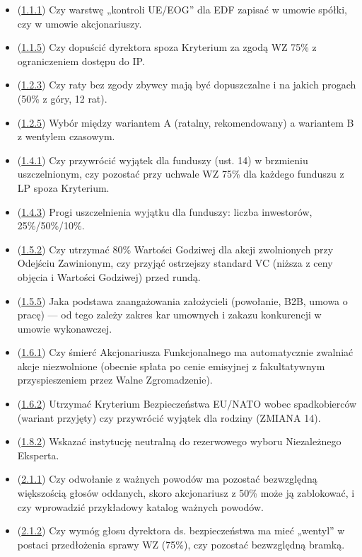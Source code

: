 \documentclass[12pt,a4paper]{report}
\begin{document}
\begin{itemize}
  \item (\hyperref[memo:1.1.1]{1.1.1}) Czy warstwę „kontroli UE/EOG” dla EDF zapisać w umowie spółki, czy w umowie akcjonariuszy.
  \item (\hyperref[memo:1.1.5]{1.1.5}) Czy dopuścić dyrektora spoza Kryterium za zgodą WZ 75\% z ograniczeniem dostępu do IP.
  \item (\hyperref[memo:1.2.3]{1.2.3}) Czy raty bez zgody zbywcy mają być dopuszczalne i na jakich progach (50\% z góry, 12 rat).
  \item (\hyperref[memo:1.2.5]{1.2.5}) Wybór między wariantem A (ratalny, rekomendowany) a wariantem B z wentylem czasowym.
  \item (\hyperref[memo:1.4.1]{1.4.1}) Czy przywrócić wyjątek dla funduszy (ust. 14) w brzmieniu uszczelnionym, czy pozostać przy uchwale WZ 75\% dla każdego funduszu z LP spoza Kryterium.
  \item (\hyperref[memo:1.4.3]{1.4.3}) Progi uszczelnienia wyjątku dla funduszy: liczba inwestorów, 25\%/50\%/10\%.
  \item (\hyperref[memo:1.5.2]{1.5.2}) Czy utrzymać 80\% Wartości Godziwej dla akcji zwolnionych przy Odejściu Zawinionym, czy przyjąć ostrzejszy standard VC (niższa z ceny objęcia i Wartości Godziwej) przed rundą.
  \item (\hyperref[memo:1.5.5]{1.5.5}) Jaka podstawa zaangażowania założycieli (powołanie, B2B, umowa o pracę) — od tego zależy zakres kar umownych i zakazu konkurencji w umowie wykonawczej.
  \item (\hyperref[memo:1.6.1]{1.6.1}) Czy śmierć Akcjonariusza Funkcjonalnego ma automatycznie zwalniać akcje niezwolnione (obecnie spłata po cenie emisyjnej z fakultatywnym przyspieszeniem przez Walne Zgromadzenie).
  \item (\hyperref[memo:1.6.2]{1.6.2}) Utrzymać Kryterium Bezpieczeństwa EU/NATO wobec spadkobierców (wariant przyjęty) czy przywrócić wyjątek dla rodziny (ZMIANA 14).
  \item (\hyperref[memo:1.8.2]{1.8.2}) Wskazać instytucję neutralną do rezerwowego wyboru Niezależnego Eksperta.
  \item (\hyperref[memo:2.1.1]{2.1.1}) Czy odwołanie z ważnych powodów ma pozostać bezwzględną większością głosów oddanych, skoro akcjonariusz z 50\% może ją zablokować, i czy wprowadzić przykładowy katalog ważnych powodów.
  \item (\hyperref[memo:2.1.2]{2.1.2}) Czy wymóg głosu dyrektora ds. bezpieczeństwa ma mieć „wentyl” w postaci przedłożenia sprawy WZ (75\%), czy pozostać bezwzględną bramką.

\end{itemize}
\end{document}
